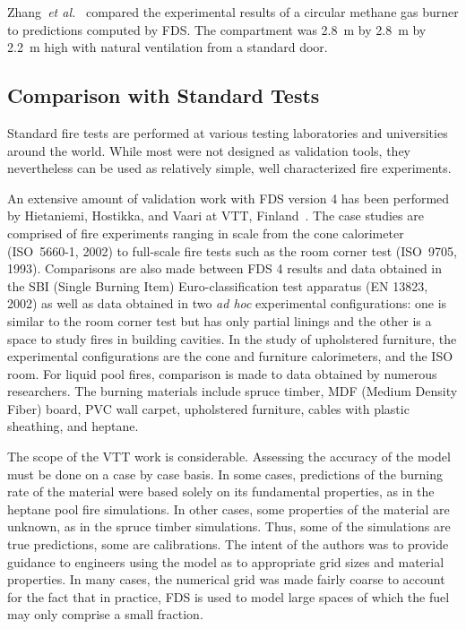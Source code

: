 Zhang~{\em et al.}~\cite{Zhang:1} compared the experimental results of a  circular methane  gas burner  to predictions  computed by  FDS. The
compartment was 2.8~m by 2.8~m  by 2.2~m high with natural ventilation from a  standard door.






\subsection{Comparison with Standard Tests}

Standard fire tests are  performed at various testing laboratories and universities  around  the world.   While  most  were  not designed  as
validation tools, they nevertheless  can be used as relatively simple, well characterized fire experiments.

An extensive  amount of  validation work with  FDS version 4  has been performed    by   Hietaniemi,    Hostikka,   and    Vaari    at   VTT,
Finland~\cite{Hietaniemi:1}.  The  case studies are  comprised of fire experiments ranging  in scale  from the cone  calorimeter (ISO~5660-1, 2002)
to full-scale fire tests such as the room corner test (ISO~9705, 1993).  Comparisons are  also  made  between FDS  4  results and  data obtained  in
the  SBI (Single  Burning Item)  Euro-classification test apparatus (EN  13823, 2002) as  well as data  obtained in two  {\em ad hoc} experimental
configurations: one is  similar to the  room corner test but  has only partial linings and  the other is a  space to study fires in building
cavities. In the study of upholstered furniture, the experimental configurations  are the cone  and furniture calorimeters, and the  ISO room. For
liquid  pool fires, comparison is  made to data obtained  by  numerous  researchers.   The burning  materials  include spruce  timber, MDF  (Medium
Density  Fiber) board,  PVC  wall carpet, upholstered furniture, cables with plastic sheathing, and heptane.

The scope of the VTT work is considerable. Assessing the accuracy of the model must be done on a case by case basis. In some cases, predictions of
the burning rate of the material were based solely on its fundamental properties, as in the heptane pool fire simulations. In other cases, some
properties of the material are unknown, as in the spruce timber simulations. Thus, some of the simulations are true predictions, some are
calibrations. The intent of the authors was to provide guidance to engineers using the model as to appropriate grid sizes and material properties. In
many cases, the numerical grid was made fairly coarse to account for the fact that in practice, FDS is used to model large spaces of which the fuel
may only comprise a small fraction.


